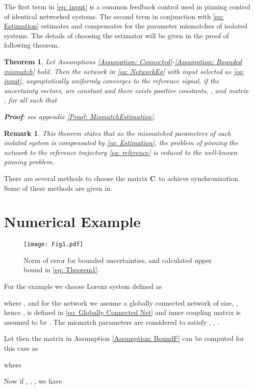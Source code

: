\documentclass[conference]{IEEEtran}
\newtheorem{theo}{Theorem}
\newtheorem{remark}{Remark}
\def\bC{\mbox{{\bf C}}}
\begin{document}
		The first term in \eqref{eq: input} is a common feedback control used in pinning control of identical networked systems\cite{Chen07,Manaffam13a,Manaffam13b,Yu09}. The second term in conjunction with \eqref{eq: Estimation} estimates and compensates for the parameter mismatches of isolated systems. The details of choosing the estimator will be given in the proof of following theorem.
		\begin{theo}\label{Theorem: MismatchEstimation}
		Let Assumptions \ref{Assumption: Connected}-\ref{Assumption: Bounded mismatch} hold. Then the network in \eqref{eq: NetworkEq} with input selected as \eqref{eq: input}, asymptotically uniformly converges to the reference signal, if the uncertainty vectors,  are constant and there exists positive constants, , and matrix ,  for all  such that
				
		{\bf Proof}: see appendix \ref{Proof: MismatchEstimation}.
	\end{theo}
	\begin{remark}
		This theorem states that as the mismatched parameters of each isolated system is compensated by \eqref{eq: Estimation}, the problem of pinning the network to the reference trajectory \eqref{eq: reference} is reduced to the well-known pinning problem.
	\end{remark}
	There are several methods to choose the matrix \bC~to achieve synchronization. Some of these methods are given in\cite{Chen07,Manaffam13a,Yu09}.		
	 
\section{Numerical Example}
	\begin{figure}[!t]
	\texttt{[image: Fig1.pdf]}
	\caption{Norm of error for bounded uncertainties, and calculated upper bound in \eqref{eq: Theorem1}.}\label{fig: Bound}
	\end{figure}
	For the example we choose Lorenz system defined as
	
	where ,  and for the network we assume a globally connected network of size, , hence ,  is defined in \eqref{eq: Globally Connected  Net} and inner coupling matrix is assumed to be . The mismatch parameters are considered to satisfy , , . 

Let  then the matrix  in Assumption \ref{Assumption: BoundF} can be computed for this case as
	
	where 
	
	
	Now if , , , we have
	
\end{document}
